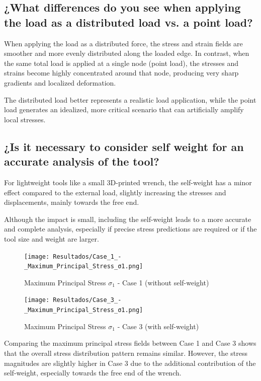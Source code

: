 \documentclass[12pt]{article}
\begin{document}
\subsection{¿What differences do you see when applying the load as a distributed load vs. a point load?}

When applying the load as a distributed force, the stress and strain fields are smoother and more evenly distributed along the loaded edge.  
In contrast, when the same total load is applied at a single node (point load), the stresses and strains become highly concentrated around that node, producing very sharp gradients and localized deformation.

The distributed load better represents a realistic load application, while the point load generates an idealized, more critical scenario that can artificially amplify local stresses.

\subsection{¿Is it necessary to consider self weight for an accurate analysis of the tool?}

For lightweight tools like a small 3D-printed wrench, the self-weight has a minor effect compared to the external load, slightly increasing the stresses and displacements, mainly towards the free end.

Although the impact is small, including the self-weight leads to a more accurate and complete analysis, especially if precise stress predictions are required or if the tool size and weight are larger.

\begin{figure}[H]
    \centering
    \begin{minipage}{0.48\textwidth}
        \centering
        \texttt{[image: Resultados/Case\_1\_-\_Maximum\_Principal\_Stress\_σ1.png]}
        \caption{Maximum Principal Stress $\sigma_1$ - Case 1 (without self-weight)}
        \label{fig:stress_case1}
    \end{minipage}
    \hfill
    \begin{minipage}{0.48\textwidth}
        \centering
        \texttt{[image: Resultados/Case\_3\_-\_Maximum\_Principal\_Stress\_σ1.png]}
        \caption{Maximum Principal Stress $\sigma_1$ - Case 3 (with self-weight)}
        \label{fig:stress_case3}
    \end{minipage}
\end{figure}

Comparing the maximum principal stress fields between Case 1 and Case 3 shows that the overall stress distribution pattern remains similar.  
However, the stress magnitudes are slightly higher in Case 3 due to the additional contribution of the self-weight, especially towards the free end of the wrench.
\end{document}
